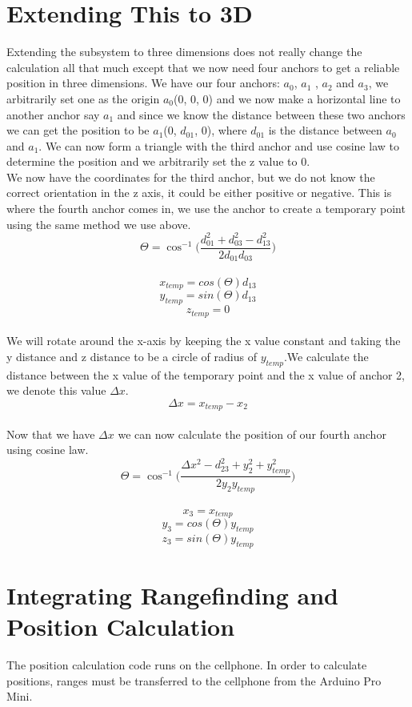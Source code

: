 \section{Extending This to 3D}
Extending the subsystem to three dimensions does not really change the calculation all that much except that we now need four anchors to get a reliable position in three dimensions. We have our four anchors: $a_{0}$, $a_{1}$ , $a_{2}$ and $a_{3}$, we arbitrarily set one as the origin $a_{0}$(0, 0, 0) and we now make a horizontal line to another anchor say $a_{1}$ and since we know the distance between these two anchors we can get the position to be $a_{1}$(0, $d_{01}$, 0), where $d_{01}$ is the distance between $a_{0}$ and $a_{1}$. We can now form a triangle with the third anchor and use cosine law to determine the position and we arbitrarily set the z value to 0.
\\
We now have the coordinates for the third anchor, but we do not know the correct orientation in the z axis, it could be either positive or negative. This is where the fourth anchor comes in, we use the anchor to create a temporary point using the same method we use above.
\\
\[ \Theta = \cos ^{ - 1}\Big(\frac{d_{01}^2 + d_{03}^2 - d_{13}^2 }{2 d_{01} d_{03}}\Big)\]
\\
\[ x_{temp} = cos(\Theta) d_{13} \]
\[ y_{temp} = sin(\Theta) d_{13} \]
\[ z_{temp} = 0 \]
\\
We will rotate around the x-axis by keeping the x value constant and taking the y distance and z distance to be a circle of radius of $y_{temp}$.We calculate the distance between the x value of the temporary point and the x value of anchor 2, we denote this value $\Delta x$.
\\
\[ \Delta x = x_{temp} - x_{2} \]
\\
Now that we have $\Delta x$ we can now calculate the position of our fourth anchor using cosine law.
\\
\[\Theta = \cos ^{ - 1}\Big(\frac {\Delta x^2 - d_{23}^2 + y_{2}^2 + y_{temp}^2}{2 y_{2} y_{temp}}\Big)\]
\\
\[ x_{3} = x_{temp} \]
\[ y_{3} = cos(\Theta) y_{temp} \]
\[ z_{3} = sin(\Theta) y_{temp} \]

\section{Integrating Rangefinding and Position Calculation}
The position calculation code runs on the cellphone. In order to calculate positions, ranges must be transferred to the cellphone from the Arduino Pro Mini. 


